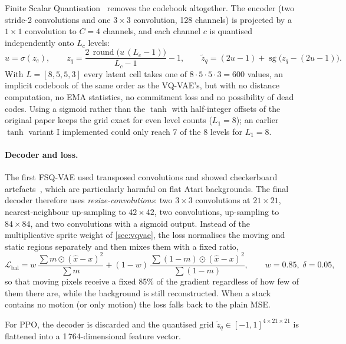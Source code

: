 \documentclass[runningheads]{llncs}
\newcommand{\sg}{\operatorname{sg}}
\begin{document}
Finite Scalar Quantisation~\cite{mentzer2024fsq} removes the codebook altogether. The
encoder (two stride-2 convolutions and one $3\times3$ convolution, 128 channels) is
projected by a $1\times1$ convolution to $C=4$ channels, and each channel $c$ is
quantised independently onto $L_c$ levels:
\begin{equation}
  u=\sigma(z_e),\qquad
  z_q = \frac{2\,\operatorname{round}\big(u\,(L_c-1)\big)}{L_c-1}-1,\qquad
  \tilde z_q = (2u-1) + \sg\big(z_q-(2u-1)\big).
\end{equation}
With $L=[8,5,5,3]$ every latent cell takes one of $8\cdot5\cdot5\cdot3=600$ values, an
implicit codebook of the same order as the VQ-VAE's, but with no distance computation,
no EMA statistics, no commitment loss and no possibility of dead codes. Using a sigmoid
rather than the $\tanh$ with half-integer offsets of the original paper keeps the grid
exact for even level counts ($L_1=8$); an earlier $\tanh$ variant I implemented could only reach
7 of the 8 levels for $L_1=8$.

\paragraph{Decoder and loss.}
The first FSQ-VAE used transposed convolutions and showed checkerboard
artefacts~\cite{odena2016deconvolution}, which are particularly harmful on flat Atari
backgrounds. The final decoder therefore uses \emph{resize-convolutions}: two
$3\times3$ convolutions at $21\times21$, nearest-neighbour up-sampling to $42\times42$,
two convolutions, up-sampling to $84\times84$, and two convolutions with a sigmoid
output. Instead of the multiplicative sprite weight of \cref{sec:vqvae}, the loss
normalises the moving and static regions separately and then mixes them with a fixed
ratio,
\begin{equation}
  \mathcal{L}_{\text{bal}} = w\,\frac{\sum m\odot(\hat x-x)^2}{\sum m}
  +(1-w)\,\frac{\sum (1-m)\odot(\hat x-x)^2}{\sum (1-m)},\qquad w=0.85,\;\delta=0.05,
\end{equation}
so that moving pixels receive a fixed 85\% of the gradient regardless of how few of them
there are, while the background is still reconstructed. When a stack contains no motion
(or only motion) the loss falls back to the plain MSE.

For PPO, the decoder is discarded and the quantised grid $\tilde z_q\in[-1,1]^{4\times21\times21}$
is flattened into a 1\,764-dimensional feature vector.

\end{document}
